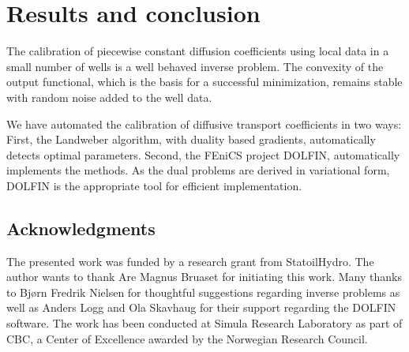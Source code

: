 \section{Results and conclusion}

The calibration of piecewise constant diffusion coefficients
using local data in a small number of wells is a well behaved inverse problem.
The convexity of the output functional, which is the basis for a successful minimization,
remains stable with random noise added to the well data.

We have automated the calibration of diffusive transport coefficients in two ways:
First, the Landweber algorithm, with duality based gradients, automatically detects optimal parameters.
Second, the FEniCS project DOLFIN, automatically implements the methods.
As the dual problems are derived in variational form,
DOLFIN is the appropriate tool for efficient implementation.

\subsection*{Acknowledgments}

The presented work was funded by a research grant from StatoilHydro.
The author wants to thank Are Magnus Bruaset for initiating this work.
Many thanks to Bj{\o}rn Fredrik Nielsen for thoughtful suggestions regarding inverse problems
as well as Anders Logg and Ola Skavhaug for their support regarding the DOLFIN software.
The work has been conducted at Simula Research Laboratory as part of CBC,
a Center of Excellence awarded by the Norwegian Research Council.
